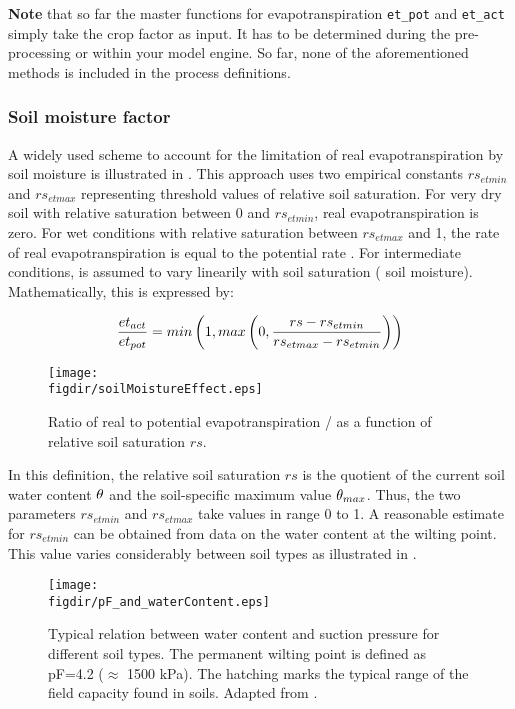 \textbf{Note} that so far the master functions for evapotranspiration \verb!et_pot! and \verb!et_act! simply take the crop factor as input. It has to be determined during the pre-processing or within your model engine. So far, none of the aforementioned methods is included in the process definitions.

\subsubsection{Soil moisture factor} \label{sec:eta:soilmoisture}

A widely used scheme to account for the limitation of real evapotranspiration by soil moisture is illustrated in . This approach uses two empirical constants $rs_{et min}$ and $rs_{et max}$ representing threshold values of relative soil saturation. For very dry soil with relative saturation between 0 and $rs_{et min}$, real evapotranspiration is zero. For wet conditions with relative saturation between $rs_{et max}$ and 1, the rate of real evapotranspiration \etReal{} is equal to the potential rate \etPot{}. For intermediate conditions, \etReal{} is assumed to vary linearily with soil saturation (\ie{} soil moisture). Mathematically, this is expressed by:

\begin{equation} \label{eqn:eta:soilmoisture}
  \frac{et_{act}}{et_{pot}} = min\left(1, max\left(0, \frac{rs-rs_{et min}}{rs_{et max}-rs_{et min}} \right)\right)
\end{equation}

\begin{figure}
  \centering
  \texttt{[image: \\figdir/soilMoistureEffect.eps]}
  \caption{Ratio of real to potential evapotranspiration \etReal/\etPot{} as a function of relative soil saturation $rs$. \label{fig:eta:soilmoisture}}
\end{figure}

In this definition, the relative soil saturation $rs$ is the quotient of the current soil water content $\theta$ and the soil-specific maximum value $\theta_{max}$. Thus, the two parameters $rs_{et min}$ and $rs_{et max}$ take values in range 0 to 1. A reasonable estimate for $rs_{et min}$ can be obtained from data on the water content at the wilting point. This value varies considerably between soil types as illustrated in .

\begin{figure}
  \centering
  \texttt{[image: \\figdir/pF\_and\_waterContent.eps]}
  \caption{Typical relation between water content and suction pressure for different soil types. The permanent wilting point is defined as pF=4.2 ($\approx$ 1500 kPa). The hatching marks the typical range of the field capacity found in soils. Adapted from \citet{Scheffer1998}. \label{fig:eta:pFCurve}}
\end{figure}

